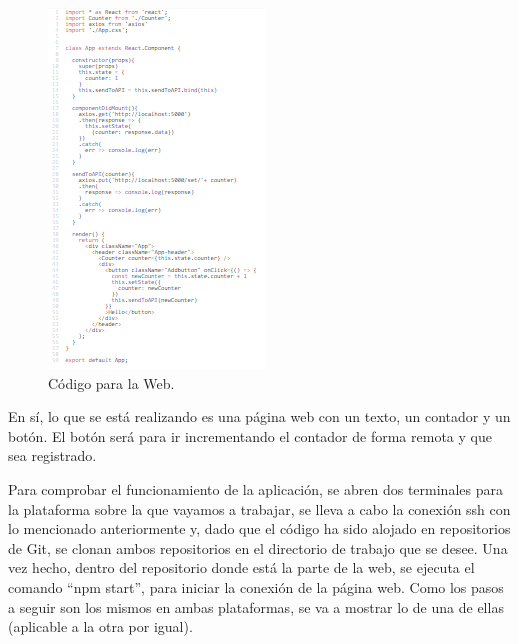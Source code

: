 \documentclass[10pt]{article}
\begin{document}
\begin{figure}[h!]
 \includegraphics[width=\linewidth]{./Web/Azure/CodigoWeb1.png}
 \caption{Código para la Web.}
\end{figure}

En sí, lo que se está realizando es una página web con un texto, un contador y un
botón. El botón será para ir incrementando el contador de forma remota y que sea
registrado.

Para comprobar el funcionamiento de la aplicación, se abren dos terminales para la
plataforma sobre la que vayamos a trabajar, se lleva a cabo la conexión ssh con lo
mencionado anteriormente y, dado que el código ha sido alojado en repositorios de
Git, se clonan ambos repositorios en el directorio de trabajo que se desee. Una vez
hecho, dentro del repositorio donde está la parte de la web, se ejecuta el comando
“npm start”, para iniciar la conexión de la página web. Como los pasos a seguir son
los mismos en ambas plataformas, se va a mostrar lo de una de ellas (aplicable a la
otra por igual).
\end{document}
